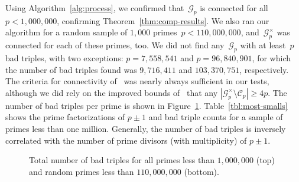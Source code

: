 \documentclass{article}
\theoremstyle{definition}
\theoremstyle{remark}
\begin{document}
Using Algorithm~\ref{alg:process}, we confirmed that~$\mathcal{G}_p$ is connected for all~$p < 1,000,000$, confirming Theorem~\ref{thm:comp-results}.
We also ran our algorithm for a random sample of $1,000$ primes~$p < 110,000,000$, and~$\mathcal{G}_p^\times$ was connected for each of these primes, too.
We did not find any~$\mathcal{G}_p$ with at least~$p$ bad triples, with two exceptions: $p = 7,558,541$ and $p = 96,840,901$, for which the number of bad triples found was $9,716,411$ and $103,370,751$, respectively.
The criteria for connectivity of~\cite{chen} was nearly always sufficient in our tests, although we did rely on the improved bounds of~\cite{fuchs} that any $|\mathcal{G}_p^\times \setminus \mathcal{C}_p| \geq 4p$.
The number of bad triples per prime is shown in Figure~\ref{fig:bad-triples}.
Table~\ref{tbl:most-smalls} shows the prime factorizations of $p \pm 1$ and bad triple counts for a sample of primes less than one million.
Generally, the number of bad triples is inversely correlated with the number of prime divisors (with multiplicity) of $p \pm 1$.

\begin{figure}[tbph]
\begin{center}
    

    
    \caption{Total number of bad triples for all primes less than $1,000,000$ (top) and random primes less than $110,000,000$ (bottom).}
    \label{fig:bad-triples}
\end{center}
\end{figure}
\end{document}
